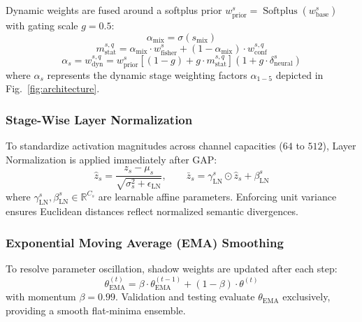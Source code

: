 \documentclass[conference]{IEEEtran}
\begin{document}
Dynamic weights are fused around a softplus prior $w_{\text{prior}}^s = \operatorname{Softplus}(w_{\text{base}}^s)$ with gating scale $g = 0.5$:
\begin{equation}
    \alpha_{\text{mix}} = \sigma(s_{\text{mix}})
\end{equation}
\begin{equation}
    m_{\text{stat}}^{s,q} = \alpha_{\text{mix}} \cdot w_{\text{fisher}}^s + (1 - \alpha_{\text{mix}}) \cdot w_{\text{conf}}^{s,q}
\end{equation}
\begin{equation}
    \alpha_s = w_{\text{dyn}}^{s,q} = w_{\text{prior}}^s \left[(1 - g) + g \cdot m_{\text{stat}}^{s,q}\right] \left(1 + g \cdot \delta_{\text{neural}}^s\right)
\end{equation}
where $\alpha_s$ represents the dynamic stage weighting factors $\alpha_{1-5}$ depicted in Fig.~\ref{fig:architecture}.

\subsubsection{Stage-Wise Layer Normalization}
To standardize activation magnitudes across channel capacities ($64$ to $512$), Layer Normalization is applied immediately after GAP:
\begin{equation}
    \hat{z}_s = \frac{z_s - \mu_s}{\sqrt{\sigma_s^2 + \epsilon_{\text{LN}}}}, \qquad \bar{z}_s = \gamma_{\text{LN}}^s \odot \hat{z}_s + \beta_{\text{LN}}^s
\end{equation}
where $\gamma_{\text{LN}}^s, \beta_{\text{LN}}^s \in \mathbb{R}^{C_s}$ are learnable affine parameters. Enforcing unit variance ensures Euclidean distances reflect normalized semantic divergences.

\subsubsection{Exponential Moving Average (EMA) Smoothing}
To resolve parameter oscillation, shadow weights are updated after each step:
\begin{equation}
    \theta_{\text{EMA}}^{(t)} = \beta \cdot \theta_{\text{EMA}}^{(t-1)} + (1 - \beta) \cdot \theta^{(t)}
\end{equation}
with momentum $\beta = 0.99$. Validation and testing evaluate $\theta_{\text{EMA}}$ exclusively, providing a smooth flat-minima ensemble.
\end{document}
